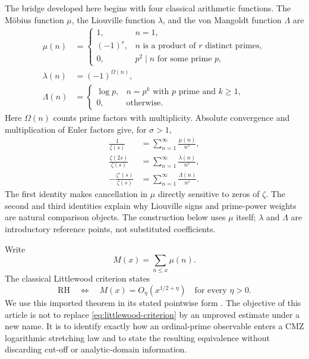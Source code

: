 \documentclass[11pt]{amsart}
\numberwithin{equation}{section}
\theoremstyle{plain}
\theoremstyle{definition}
\theoremstyle{remark}
\newcommand{\RH}{\mathrm{RH}}
\begin{document}
The bridge developed here begins with four classical arithmetic functions.
The M\"obius function $\mu$, the Liouville function $\lambda$, and the von
Mangoldt function $\Lambda$ are
\begin{align}
\mu(n)&=
\begin{cases}
1,&n=1,\\
(-1)^r,&n\text{ is a product of }r\text{ distinct primes},\\
0,&p^2\mid n\text{ for some prime }p,
\end{cases}
\label{eq:mobius-definition}\\
\lambda(n)&=(-1)^{\Omega(n)},
\label{eq:liouville-definition}\\
\Lambda(n)&=
\begin{cases}
\log p,&n=p^k\text{ with }p\text{ prime and }k\ge1,\\
0,&\text{otherwise}.
\end{cases}
\label{eq:mangoldt-definition}
\end{align}
Here $\Omega(n)$ counts prime factors with multiplicity.  Absolute convergence
and multiplication of Euler factors give, for $\sigma>1$,
\begin{align}
\frac1{\zeta(s)}&=\sum_{n=1}^{\infty}\frac{\mu(n)}{n^s},
\label{eq:mobius-zeta}\\
\frac{\zeta(2s)}{\zeta(s)}&=
\sum_{n=1}^{\infty}\frac{\lambda(n)}{n^s},
\label{eq:liouville-zeta}\\
-\frac{\zeta'(s)}{\zeta(s)}&=
\sum_{n=1}^{\infty}\frac{\Lambda(n)}{n^s}.
\label{eq:mangoldt-zeta}
\end{align}
The first identity makes cancellation in $\mu$ directly sensitive to zeros of
$\zeta$.  The second and third identities explain why Liouville signs and
prime-power weights are natural comparison objects.  The construction below
uses $\mu$ itself; $\lambda$ and $\Lambda$ are introductory reference points,
not substituted coefficients.

Write
\begin{equation}
M(x)=\sum_{n\le x}\mu(n).
\label{eq:mertens-definition}
\end{equation}
The classical Littlewood criterion states
\begin{equation}
\RH\quad\Longleftrightarrow\quad
M(x)=O_\eta\!\left(x^{1/2+\eta}\right)
\quad\text{for every }\eta>0.
\label{eq:littlewood-criterion}
\end{equation}
We use this imported theorem in its stated pointwise form
\cite{Littlewood1912,Titchmarsh1986}.  The objective of this article is not to
replace \eqref{eq:littlewood-criterion} by an unproved estimate under a new
name.  It is to identify exactly how an ordinal-prime observable enters a CMZ
logarithmic stretching law and to state the resulting equivalence without
discarding cut-off or analytic-domain information.
\end{document}
